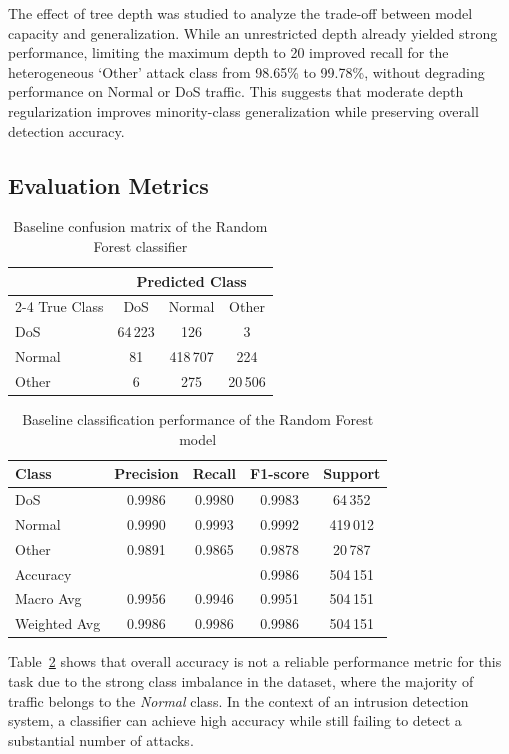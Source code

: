 \documentclass[conference]{IEEEtran}
\begin{document}
The effect of tree depth was studied to analyze the trade-off between model capacity and generalization. While an unrestricted depth already yielded strong performance, limiting the maximum depth to 20 improved recall for the heterogeneous ‘Other’ attack class from 98.65\% to 99.78\%, without degrading performance on Normal or DoS traffic. This suggests that moderate depth regularization improves minority-class generalization while preserving overall detection accuracy.

\subsection{Evaluation Metrics}
\begin{table}[h]
\centering
\caption{Baseline confusion matrix of the Random Forest classifier}
\label{tab:confusion_matrix}
\begin{tabular}{lccc}
\toprule
 & \multicolumn{3}{c}{Predicted Class} \\
\cmidrule(lr){2-4}
True Class & DoS & Normal & Other \\
\midrule
DoS    & 64\,223 & 126 & 3 \\
Normal & 81 & 418\,707 & 224 \\
Other  & 6 & 275 & 20\,506 \\
\bottomrule
\end{tabular}
\end{table}

\begin{table}[h]
\centering
\caption{Baseline classification performance of the Random Forest model}
\label{tab:classification_report}
\begin{tabular}{lcccc}
\toprule
Class & Precision & Recall & F1-score & Support \\
\midrule
DoS    & 0.9986 & 0.9980 & 0.9983 & 64\,352 \\
Normal & 0.9990 & 0.9993 & 0.9992 & 419\,012 \\
Other  & 0.9891 & 0.9865 & 0.9878 & 20\,787 \\
\midrule
Accuracy     &        &        & 0.9986 & 504\,151 \\
Macro Avg    & 0.9956 & 0.9946 & 0.9951 & 504\,151 \\
Weighted Avg & 0.9986 & 0.9986 & 0.9986 & 504\,151 \\
\bottomrule
\end{tabular}
\end{table}

Table~\ref{tab:classification_report} shows that overall accuracy is not a reliable performance metric for this task due to the strong class imbalance in the dataset, where the majority of traffic belongs to the \textit{Normal} class. In the context of an intrusion detection system, a classifier can achieve high accuracy while still failing to detect a substantial number of attacks.
\end{document}

